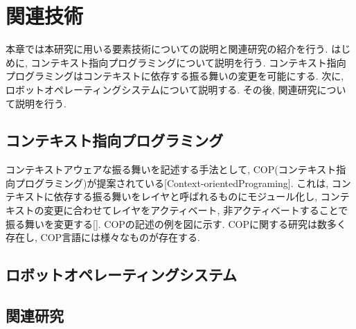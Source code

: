 
\chapter{関連技術}
\label{cha:related_work}
本章では本研究に用いる要素技術についての説明と関連研究の紹介を行う.
はじめに, コンテキスト指向プログラミングについて説明を行う. コンテキスト指向プログラミングはコンテキストに依存する振る舞いの変更を可能にする.
次に, ロボットオペレーティングシステムについて説明する.
その後, 関連研究について説明を行う.


\section{コンテキスト指向プログラミング}
コンテキストアウェアな振る舞いを記述する手法として, COP(コンテキスト指向プログラミング)が提案されている[Context-orientedPrograming]. これは, コンテキストに依存する振る舞いをレイヤと呼ばれるものにモジュール化し, コンテキストの変更に合わせてレイヤをアクティベート, 非アクティベートすることで振る舞いを変更する[]. COPの記述の例を図に示す. COPに関する研究は数多く存在し, COP言語には様々なものが存在する. 

\section{ロボットオペレーティングシステム}



\section{関連研究}




